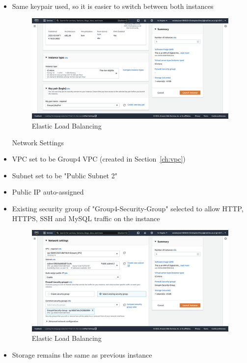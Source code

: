 \begin{itemize}
    \item Same keypair used, so it is easier to switch between both instances \begin{figure}[!htbp]
                                                                                  \centering
                                                                                  \includegraphics[width=\textwidth]{resources/elb/elb-instance-2-type-and-keypair.png}
                                                                                  \caption{Elastic Load Balancing}
                                                                                  \label{fig:elb-type-and-keypair}
                                                                                \end{figure}
    Network Settings
    \item VPC set to be Group4 VPC  (created in Section~\ref{ch:vpc})
    \item Subnet set to be "Public Subnet 2"
    \item Public IP auto-assigned
    \item Existing security group of "Group4-Security-Group" selected to allow HTTP, HTTPS, SSH and MySQL traffic on the
    instance \begin{figure}[!htbp]
                           \centering
                           \includegraphics[width=\textwidth]{resources/elb/elb-instance-2-network-settings.png}
                           \caption{Elastic Load Balancing}
                           \label{fig:elb-instance-2-network-setting}
                \end{figure}
    \item Storage remains the same as previous instance


\end{itemize}
